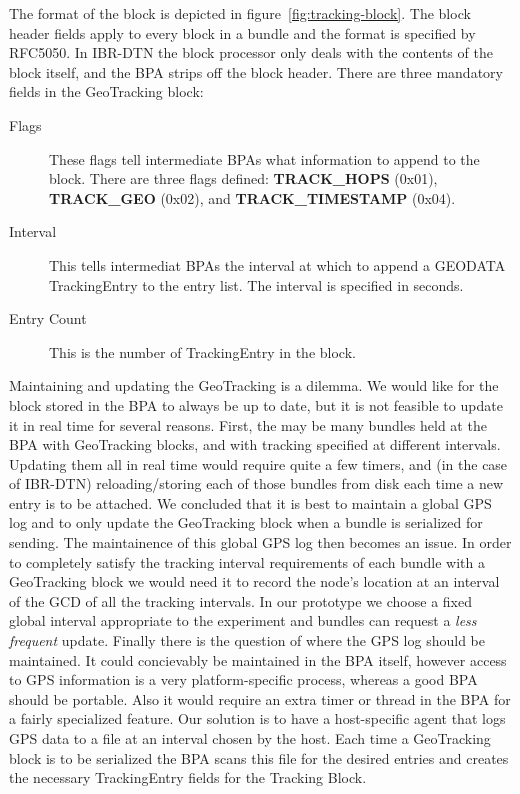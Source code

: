 \documentclass{sig-alternate}
\begin{document}
The format of the block is depicted in figure~\ref{fig:tracking-block}.  The block header fields apply to every block in a bundle and the format is specified by RFC5050.  In IBR-DTN the block processor only deals with the contents of the block itself, and the BPA strips off the block header.  There are three mandatory fields in the GeoTracking block:
\begin{description}
  \item[Flags] These flags tell intermediate BPAs what information to append to the block.  There are three flags defined: {\bf TRACK\_HOPS} (0x01), {\bf TRACK\_GEO} (0x02), and {\bf TRACK\_TIMESTAMP} (0x04).
  \item[Interval] This tells intermediat BPAs the interval at which to append a GEODATA TrackingEntry to the entry list.  The interval is specified in seconds.
  \item[Entry Count] This is the number of TrackingEntry in the block.
\end{description}

Maintaining and updating the GeoTracking is a dilemma.  We would like for the block stored in the BPA to always be up to date, but it is not feasible to update it in real time for several reasons.  First, the may be many bundles held at the BPA with GeoTracking blocks, and with tracking specified at different intervals.  Updating them all in real time would require quite a few timers, and (in the case of IBR-DTN) reloading/storing each of those bundles from disk each time a new entry is to be attached.  We concluded that it is best to maintain a global GPS log and to only update the GeoTracking block when a bundle is serialized for sending.  The maintainence of this global GPS log then becomes an issue.  In order to completely satisfy the tracking interval requirements of each bundle with a GeoTracking block we would need it to record the node's location at an interval of the GCD of all the tracking intervals.  In our prototype we choose a fixed global interval appropriate to the experiment and bundles can request a {\it less frequent} update.  Finally there is the question of where the GPS log should be maintained.  It could concievably be maintained in the BPA itself, however access to GPS information is a very platform-specific process, whereas a good BPA should be portable.  Also it would require an extra timer or thread in the BPA for a fairly specialized feature.  Our solution is to have a host-specific agent that logs GPS data to a file at an interval chosen by the host.  Each time a GeoTracking block is to be serialized the BPA scans this file for the desired entries and creates the necessary TrackingEntry fields for the Tracking Block.
\end{document}
